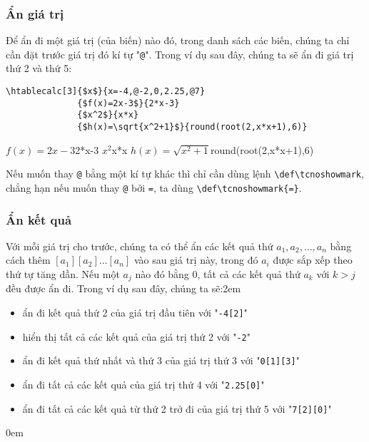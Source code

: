 \documentclass[a4paper,10pt]{article}
\newcommand\verbinline{\lstinline[breaklines=false,basicstyle=\normalsize\ttfamily]}
\newcommand\mywidth{0.85\linewidth}
\begin{document}
\subsubsection{Ẩn giá trị}
Để ẩn đi một giá trị (của biến) nào đó, trong danh sách các biến, chúng ta chỉ cần đặt trước giá trị đó kí tự "\verb|@|". Trong ví dụ sau đây, chúng ta sẽ ẩn đi giá trị thứ 2 và thứ 5: \smallskip
\begin{center}
\begin{minipage}{\mywidth}
\begin{lstlisting}
\htablecalc[3]{$x$}{x=-4,@-2,0,2.25,@7}
              {$f(x)=2x-3$}{2*x-3}
              {$x^2$}{x*x}
              {$h(x)=\sqrt{x^2+1}$}{round(root(2,x*x+1),6)}
\end{lstlisting}
\end{minipage}

              {$f(x)=2x-3$}{2*x-3}
              {$x^2$}{x*x}
              {$h(x)=\sqrt{x^2+1}$}{round(root(2,x*x+1),6)}
\end{center}
\medskip

Nếu muốn thay \verb|@| bằng một kí tự khác thì chỉ cần dùng lệnh \verbinline|\def\tcnoshowmark|, chẳng hạn nếu muốn thay \verb|@| bởi \verb|=|, ta dùng \verbinline|\def\tcnoshowmark{=}|.

\subsubsection{Ẩn kết quả}
Với mỗi giá trị cho trước, chúng ta có thể ẩn các kết quả thứ $a_1,a_2,\ldots,a_n$ bằng cách thêm $[a_1][a_2]\ldots[a_n]$ vào sau giá trị này, trong đó $a_i$ được sắp xếp theo thứ tự tăng dần. Nếu một $a_j$ nào đó bằng 0, tất cả các kết quả thứ $a_k$ với $k>j$ đều được ẩn đi.\medskip
Trong ví dụ sau đây, chúng ta sẽ:\parindent2em
\begin{itemize}
	\item ẩn đi kết quả thứ 2 của giá trị đầu tiên với "\verb|-4[2]|"
	\item hiển thị tất cả các kết quả của giá trị thứ 2 với "\verb|-2|"
	\item ẩn đi kết quả thứ nhất và thứ 3 của giá trị thứ 3 với "\verb|0[1][3]|"
	\item ẩn đi tất cả các kết quả của giá trị thứ 4 với "\verb|2.25[0]|"
	\item ẩn đi tất cả các kết quả từ thứ 2 trở đi của giá trị thứ 5 với "\verb|7[2][0]|"
\end{itemize}\parindent0em
\end{document}
